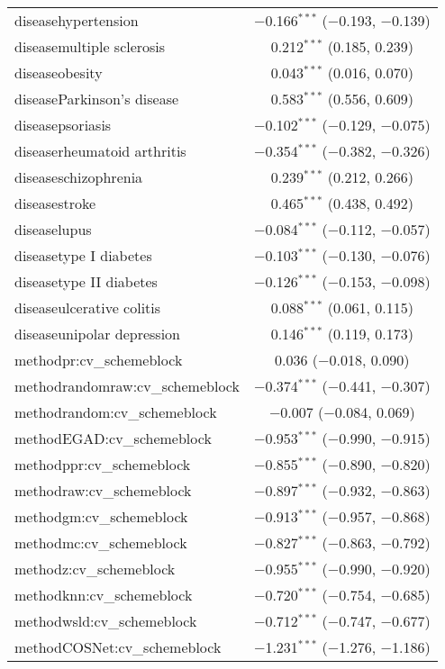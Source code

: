 \begin{table}[!htbp]
\begin{tabular}{@{\extracolsep{5pt}}lc}
  diseasehypertension & $-$0.166$^{***}$ ($-$0.193, $-$0.139) \\ 
  diseasemultiple sclerosis & 0.212$^{***}$ (0.185, 0.239) \\ 
  diseaseobesity & 0.043$^{***}$ (0.016, 0.070) \\ 
  diseaseParkinson's disease & 0.583$^{***}$ (0.556, 0.609) \\ 
  diseasepsoriasis & $-$0.102$^{***}$ ($-$0.129, $-$0.075) \\ 
  diseaserheumatoid arthritis & $-$0.354$^{***}$ ($-$0.382, $-$0.326) \\ 
  diseaseschizophrenia & 0.239$^{***}$ (0.212, 0.266) \\ 
  diseasestroke & 0.465$^{***}$ (0.438, 0.492) \\ 
  diseaselupus & $-$0.084$^{***}$ ($-$0.112, $-$0.057) \\ 
  diseasetype I diabetes & $-$0.103$^{***}$ ($-$0.130, $-$0.076) \\ 
  diseasetype II diabetes & $-$0.126$^{***}$ ($-$0.153, $-$0.098) \\ 
  diseaseulcerative colitis & 0.088$^{***}$ (0.061, 0.115) \\ 
  diseaseunipolar depression & 0.146$^{***}$ (0.119, 0.173) \\ 
  methodpr:cv\_schemeblock & 0.036 ($-$0.018, 0.090) \\ 
  methodrandomraw:cv\_schemeblock & $-$0.374$^{***}$ ($-$0.441, $-$0.307) \\ 
  methodrandom:cv\_schemeblock & $-$0.007 ($-$0.084, 0.069) \\ 
  methodEGAD:cv\_schemeblock & $-$0.953$^{***}$ ($-$0.990, $-$0.915) \\ 
  methodppr:cv\_schemeblock & $-$0.855$^{***}$ ($-$0.890, $-$0.820) \\ 
  methodraw:cv\_schemeblock & $-$0.897$^{***}$ ($-$0.932, $-$0.863) \\ 
  methodgm:cv\_schemeblock & $-$0.913$^{***}$ ($-$0.957, $-$0.868) \\ 
  methodmc:cv\_schemeblock & $-$0.827$^{***}$ ($-$0.863, $-$0.792) \\ 
  methodz:cv\_schemeblock & $-$0.955$^{***}$ ($-$0.990, $-$0.920) \\ 
  methodknn:cv\_schemeblock & $-$0.720$^{***}$ ($-$0.754, $-$0.685) \\ 
  methodwsld:cv\_schemeblock & $-$0.712$^{***}$ ($-$0.747, $-$0.677) \\ 
  methodCOSNet:cv\_schemeblock & $-$1.231$^{***}$ ($-$1.276, $-$1.186) \\ 

\end{tabular}
\end{table}
